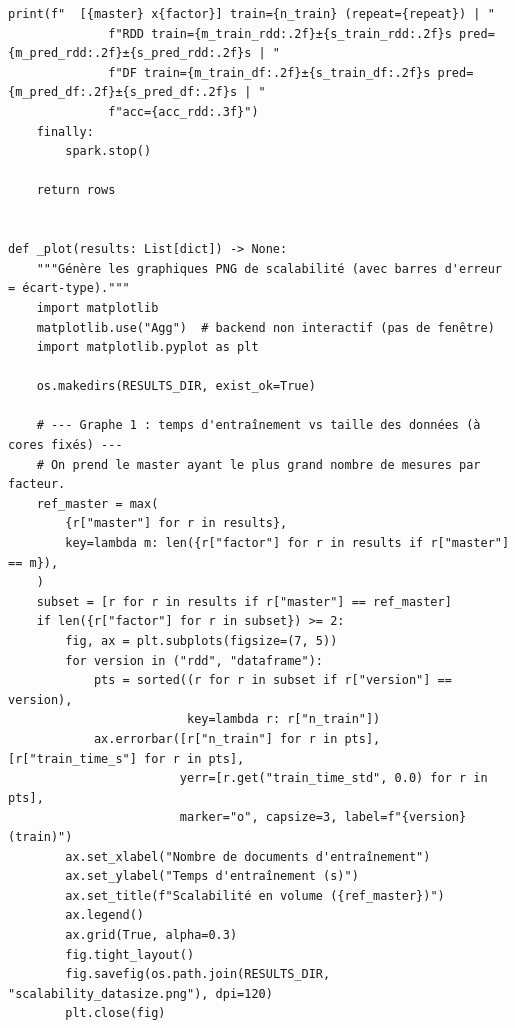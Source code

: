 \begin{lstlisting}[style=py]
        print(f"  [{master} x{factor}] train={n_train} (repeat={repeat}) | "
              f"RDD train={m_train_rdd:.2f}±{s_train_rdd:.2f}s pred={m_pred_rdd:.2f}±{s_pred_rdd:.2f}s | "
              f"DF train={m_train_df:.2f}±{s_train_df:.2f}s pred={m_pred_df:.2f}±{s_pred_df:.2f}s | "
              f"acc={acc_rdd:.3f}")
    finally:
        spark.stop()

    return rows


def _plot(results: List[dict]) -> None:
    """Génère les graphiques PNG de scalabilité (avec barres d'erreur = écart-type)."""
    import matplotlib
    matplotlib.use("Agg")  # backend non interactif (pas de fenêtre)
    import matplotlib.pyplot as plt

    os.makedirs(RESULTS_DIR, exist_ok=True)

    # --- Graphe 1 : temps d'entraînement vs taille des données (à cores fixés) ---
    # On prend le master ayant le plus grand nombre de mesures par facteur.
    ref_master = max(
        {r["master"] for r in results},
        key=lambda m: len({r["factor"] for r in results if r["master"] == m}),
    )
    subset = [r for r in results if r["master"] == ref_master]
    if len({r["factor"] for r in subset}) >= 2:
        fig, ax = plt.subplots(figsize=(7, 5))
        for version in ("rdd", "dataframe"):
            pts = sorted((r for r in subset if r["version"] == version),
                         key=lambda r: r["n_train"])
            ax.errorbar([r["n_train"] for r in pts], [r["train_time_s"] for r in pts],
                        yerr=[r.get("train_time_std", 0.0) for r in pts],
                        marker="o", capsize=3, label=f"{version} (train)")
        ax.set_xlabel("Nombre de documents d'entraînement")
        ax.set_ylabel("Temps d'entraînement (s)")
        ax.set_title(f"Scalabilité en volume ({ref_master})")
        ax.legend()
        ax.grid(True, alpha=0.3)
        fig.tight_layout()
        fig.savefig(os.path.join(RESULTS_DIR, "scalability_datasize.png"), dpi=120)
        plt.close(fig)


\end{lstlisting}
